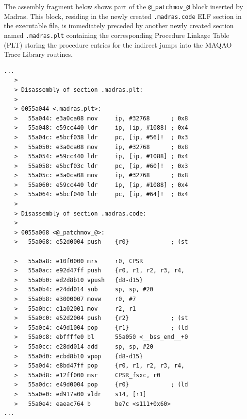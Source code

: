 \documentclass[11pt, a4paper, twoside]{montblanc2}
\begin{document}
The assembly fragment below shows part of the \verb|@_patchmov_@| block inserted 
by Madras. This block, residing in the newly created \texttt{.madras.code} ELF 
section in the executable file, is immediately preceded by another newly created 
section named \texttt{.madras.plt} containing the corresponding Procedure 
Linkage Table (PLT) storing the procedure entries for the indirect jumps into 
the MAQAO Trace Library routines.

\begin{footnotesize}
\begin{verbatim}
...
   >
   > Disassembly of section .madras.plt:
   >
   > 0055a044 <.madras.plt>:
   >   55a044: e3a0ca08 mov     ip, #32768      ; 0x8
   >   55a048: e59cc440 ldr     ip, [ip, #1088] ; 0x4
   >   55a04c: e5bcf038 ldr     pc, [ip, #56]!  ; 0x3
   >   55a050: e3a0ca08 mov     ip, #32768      ; 0x8
   >   55a054: e59cc440 ldr     ip, [ip, #1088] ; 0x4
   >   55a058: e5bcf03c ldr     pc, [ip, #60]!  ; 0x3
   >   55a05c: e3a0ca08 mov     ip, #32768      ; 0x8
   >   55a060: e59cc440 ldr     ip, [ip, #1088] ; 0x4
   >   55a064: e5bcf040 ldr     pc, [ip, #64]!  ; 0x4
   >
   > Disassembly of section .madras.code:
   >
   > 0055a068 <@_patchmov_@>:
   >   55a068: e52d0004 push    {r0}            ; (st

   >   55a0a8: e10f0000 mrs     r0, CPSR
   >   55a0ac: e92d47ff push    {r0, r1, r2, r3, r4, 
   >   55a0b0: ed2d8b10 vpush   {d8-d15}
   >   55a0b4: e24dd014 sub     sp, sp, #20
   >   55a0b8: e3000007 movw    r0, #7
   >   55a0bc: e1a02001 mov     r2, r1
   >   55a0c0: e52d2004 push    {r2}            ; (st
   >   55a0c4: e49d1004 pop     {r1}            ; (ld
   >   55a0c8: ebffffe0 bl      55a050 <__bss_end__+0
   >   55a0cc: e28dd014 add     sp, sp, #20
   >   55a0d0: ecbd8b10 vpop    {d8-d15}
   >   55a0d4: e8bd47ff pop     {r0, r1, r2, r3, r4, 
   >   55a0d8: e12ff000 msr     CPSR_fsxc, r0
   >   55a0dc: e49d0004 pop     {r0}            ; (ld
   >   55a0e0: ed917a00 vldr    s14, [r1]
   >   55a0e4: eaeac764 b       be7c <s111+0x60>
...
\end{verbatim}
\end{footnotesize}
\end{document}
